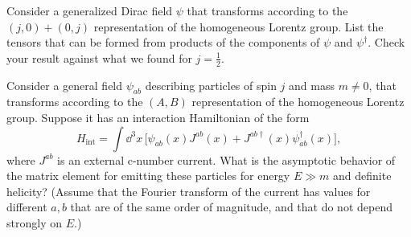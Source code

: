 \begin{enumerate}
 Consider a generalized Dirac field $\psi$ that transforms according to
the $(j,0)+(0,j)$ representation of the homogeneous Lorentz group. List the
tensors that can be formed from products of the components of $\psi$ and
$\psi^\dagger$. Check your result against what we found for $j=\tfrac12$.

 Consider a general field $\psi_{ab}$ describing particles of spin $j$
and mass $m\ne0$, that transforms according to the $(A,B)$ representation of
the homogeneous Lorentz group. Suppose it has an interaction Hamiltonian of
the form
\[
  H_{\mathrm{int}}=\int \dd^3x\,
  \bigl[\psi_{ab}(x)J^{ab}(x)
    +J^{ab\dagger}(x)\psi_{ab}^\dagger(x)\bigr],
\]
where $J^{ab}$ is an external c-number current. What is the asymptotic
behavior of the matrix element for emitting these particles for energy
$E\gg m$ and definite helicity? (Assume that the Fourier transform of the
current has values for different $a,b$ that are of the same order of
magnitude, and that do not depend strongly on $E$.)
\end{enumerate}
